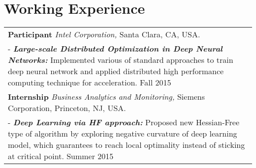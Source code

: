 \documentclass[a4paper,11pt]{article} %
\begin{document}
\section{Working Experience}
\begin{tabular}{p{17.5cm}}
\textbf{Participant} \emph{Intel Corporation,} Santa Clara, CA, USA.\\
\footnotesize{- \textbf{\emph{Large-scale Distributed Optimization in Deep Neural Networks: }}}
Implemented various of standard approaches to train deep neural network and applied distributed high performance computing technique for acceleration. \hfill{Fall 2015}\\
\textbf{Internship} \emph{Business Analytics and Monitoring,} Siemens Corporation, Princeton, NJ, USA.\\
\footnotesize{- \textbf{\emph{Deep Learning via HF approach: }}}
Proposed new Hessian-Free type of algorithm by exploring negative curvature of deep learning model, which guarantees to reach local optimality instead of sticking at critical point. \hfill{Summer 2015}\\

\end{tabular}
\end{document}
